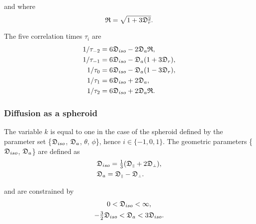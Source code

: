 \begin{htmlonly}
\begin{htmlonly}
\noindent and where
\begin{equation}
    \mathfrak{R} = \sqrt{1 + 3\mathfrak{D}_r^2}.
\end{equation}


The five correlation times $\tau_i$ are
\begin{subequations}
\begin{align}
    1/\tau_{-2} &= 6 \mathfrak{D}_{iso} - 2\mathfrak{D}_a\mathfrak{R},   \label{eq: ellipsoid tau-2} \\
    1/\tau_{-1} &= 6 \mathfrak{D}_{iso} - \mathfrak{D}_a (1 + 3\mathfrak{D}_r), \label{eq: ellipsoid tau-1} \\
    1/\tau_{0}  &= 6 \mathfrak{D}_{iso} - \mathfrak{D}_a (1 - 3\mathfrak{D}_r), \label{eq: ellipsoid tau0} \\
    1/\tau_{1}  &= 6 \mathfrak{D}_{iso} + 2\mathfrak{D}_a,               \label{eq: ellipsoid tau1} \\
    1/\tau_{2}  &= 6 \mathfrak{D}_{iso} + 2\mathfrak{D}_a\mathfrak{R}.   \label{eq: ellipsoid tau2}
\end{align}
\end{subequations}



\subsubsection{Diffusion as a spheroid}

The variable $k$ is equal to one in the case of the spheroid defined by the parameter set \{$\mathfrak{D}_{iso}$, $\mathfrak{D}_a$, $\theta$, $\phi$\}, hence $i \in \{-1, 0, 1\}$.  The geometric parameters \{$\mathfrak{D}_{iso}$, $\mathfrak{D}_a$\} are defined as
\begin{subequations}
\begin{align}
    & \mathfrak{D}_{iso} = \tfrac{1}{3} (\mathfrak{D}_{\scriptscriptstyle \parallel} + 2\mathfrak{D}_{\scriptscriptstyle \perp}),   \label{eq: Diso spheroid def} \\
    & \mathfrak{D}_a = \mathfrak{D}_{\scriptscriptstyle \parallel} - \mathfrak{D}_{\scriptscriptstyle \perp}.                       \label{eq: Da spheroid def}
\end{align}
\end{subequations}

\noindent and are constrained by
\begin{subequations}
\begin{gather}
    0 < \mathfrak{D}_{iso} < \infty, \\
    -\tfrac{3}{2} \mathfrak{D}_{iso} < \mathfrak{D}_a < 3\mathfrak{D}_{iso}.
\end{gather}
\end{subequations}


\end{htmlonly}
\end{htmlonly}
